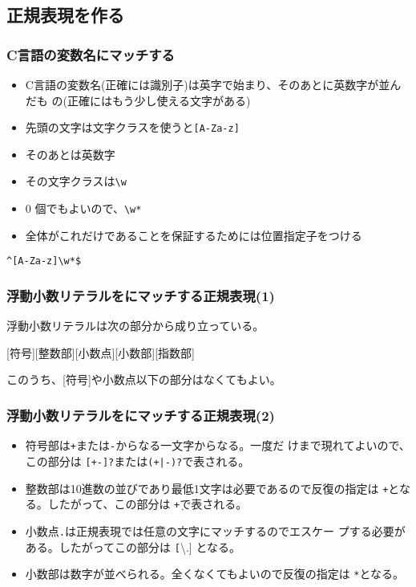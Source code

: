 \subsection{正規表現を作る}
\begin{frame}[containsverbatim]
 \frametitle{C言語の変数名にマッチする}
\begin{itemize}
 \item C言語の変数名(正確には識別子)は英字で始まり、そのあとに英数字が並んだも
の(正確にはもう少し使える文字がある)
 \item 先頭の文字は文字クラスを使うと\texttt{[A-Za-z]}
 \item そのあとは英数字
 \item その文字クラスは\texttt{\textbackslash w}
 \item $0$ 個でもよいので、\texttt{\textbackslash w*}
 \item 全体がこれだけであることを保証するためには位置指定子をつける
\end{itemize}
{\LARGE
\verb+^[A-Za-z]\w*$+}
\end{frame}
\begin{frame}[containsverbatim]
 \frametitle{浮動小数リテラルをにマッチする正規表現(1)}
浮動小数リテラルは次の部分から成り立っている。

[符号][整数部][小数点][小数部][指数部]

このうち、[符号]や小数点以下の部分はなくてもよい。

\end{frame}
\begin{frame}[containsverbatim]
 \frametitle{浮動小数リテラルをにマッチする正規表現(2)}
\begin{itemize}
 \item 符号部は\texttt{+}または\texttt{-}からなる一文字からなる。一度だ
       けまで現れてよいので、この部分は \texttt{[+-]?}または\texttt{(+|-)?}で表される。
 \item 整数部は10進数の並びであり最低1文字は必要であるので反復の指定は
       \texttt{+}となる。したがって、この部分は \texttt{\d+}で表される。
 \item 小数点\texttt{.}は正規表現では任意の文字にマッチするのでエスケー
       プする必要がある。したがってこの部分は \texttt[\textbackslash .]
       となる。
 \item 小数部は数字が並べられる。全くなくてもよいので反復の指定は
       \texttt{*}となる。
\end{itemize}
\end{frame}
